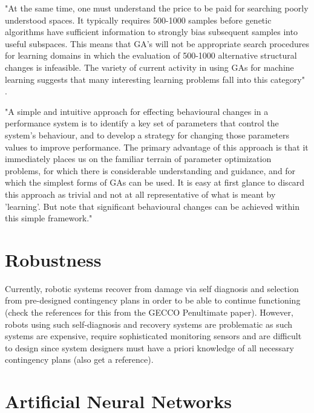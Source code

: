 "At the same time, one must understand the price to be paid for searching poorly understood spaces. It typically requires 500-1000 samples before genetic algorithms have sufficient information to strongly bias subsequent samples into useful subspaces. This means that GA's will not be appropriate search procedures for learning domains in which the evaluation of 500-1000 alternative structural changes is infeasible. The variety of current activity in using GAs for machine learning suggests that many interesting learning problems fall into this category" \cite{de1988learning}.

"A simple and intuitive approach for effecting behavioural changes in a performance system is to identify a key set of parameters that control the system's behaviour, and to develop a strategy for changing those parameters values to improve performance. The primary advantage of this approach is that it immediately places us on the familiar terrain of parameter optimization problems, for which there is considerable understanding and guidance, and for which the simplest forms of GAs can be used. It is easy at first glance to discard this approach as trivial and not at all representative of what is meant by 'learning'. But note that significant behavioural changes can be achieved within this simple framework."




\section{Robustness}

Currently, robotic systems recover from damage via self diagnosis and selection from pre-designed contingency plans in order to be able to continue functioning (check the references for this from the GECCO Penultimate paper). However, robots using such self-diagnosis and recovery systems are problematic as such systems are expensive, require sophisticated monitoring sensors and are difficult to design since system designers must have a priori knowledge of all necessary contingency plans (also get a reference).


\section{Artificial Neural Networks}

